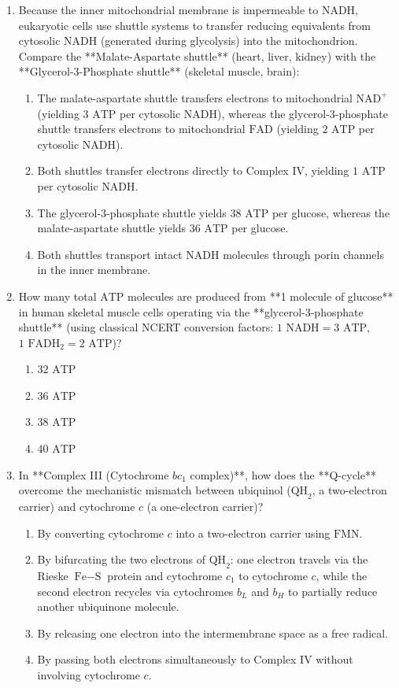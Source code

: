 \documentclass[11pt, a4paper]{article}
\begin{document}
\begin{enumerate}[label=\textbf{\arabic*.}]
\item Because the inner mitochondrial membrane is impermeable to $\text{NADH}$, eukaryotic cells use shuttle systems to transfer reducing equivalents from cytosolic $\text{NADH}$ (generated during glycolysis) into the mitochondrion. Compare the **Malate-Aspartate shuttle** (heart, liver, kidney) with the **Glycerol-3-Phosphate shuttle** (skeletal muscle, brain):
\begin{enumerate}[label=(\Alph*)]
    \item The malate-aspartate shuttle transfers electrons to mitochondrial $\text{NAD}^+$ (yielding $3\text{ ATP}$ per cytosolic $\text{NADH}$), whereas the glycerol-3-phosphate shuttle transfers electrons to mitochondrial $\text{FAD}$ (yielding $2\text{ ATP}$ per cytosolic $\text{NADH}$).
    \item Both shuttles transfer electrons directly to Complex IV, yielding $1\text{ ATP}$ per cytosolic $\text{NADH}$.
    \item The glycerol-3-phosphate shuttle yields $38\text{ ATP}$ per glucose, whereas the malate-aspartate shuttle yields $36\text{ ATP}$ per glucose.
    \item Both shuttles transport intact $\text{NADH}$ molecules through porin channels in the inner membrane.
\end{enumerate}

\item How many total $\text{ATP}$ molecules are produced from **1 molecule of glucose** in human skeletal muscle cells operating via the **glycerol-3-phosphate shuttle** (using classical NCERT conversion factors: $1\text{ NADH} = 3\text{ ATP}$, $1\text{ FADH}_2 = 2\text{ ATP}$)?
\begin{enumerate}[label=(\Alph*)]
    \item $32\text{ ATP}$
    \item $36\text{ ATP}$
    \item $38\text{ ATP}$
    \item $40\text{ ATP}$
\end{enumerate}

\item In **Complex III (Cytochrome $bc_1$ complex)**, how does the **Q-cycle** overcome the mechanistic mismatch between ubiquinol ($\text{QH}_2$, a two-electron carrier) and cytochrome $c$ (a one-electron carrier)?
\begin{enumerate}[label=(\Alph*)]
    \item By converting cytochrome $c$ into a two-electron carrier using $\text{FMN}$.
    \item By bifurcating the two electrons of $\text{QH}_2$: one electron travels via the Rieske $\text{Fe}-\text{S}$ protein and cytochrome $c_1$ to cytochrome $c$, while the second electron recycles via cytochromes $b_L$ and $b_H$ to partially reduce another ubiquinone molecule.
    \item By releasing one electron into the intermembrane space as a free radical.
    \item By passing both electrons simultaneously to Complex IV without involving cytochrome $c$.
\end{enumerate}


\end{enumerate}
\end{document}
